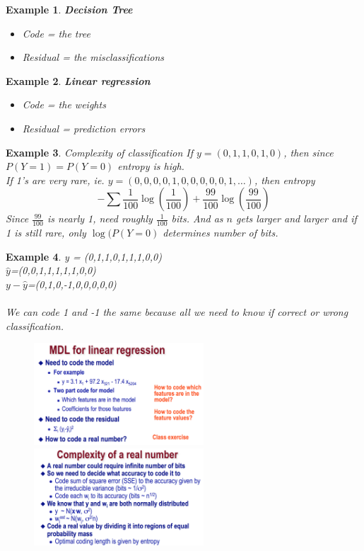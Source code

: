 \documentclass[a4paper]{article}\usepackage[]{graphicx}\usepackage[]{color}
\newtheorem{ex}{Example}[section]
\begin{document}
\begin{ex} \textbf{Decision Tree}
\begin{itemize}
\item Code = the tree
\item Residual = the misclassifications
\end{itemize}
\end{ex}

\begin{ex} \textbf{Linear regression}
\begin{itemize}
\item Code = the weights
\item Residual = prediction errors
\end{itemize}
\end{ex}

\begin{ex} \emph{Complexity of classification}
If $y = (0,1,1,0,1,0)$, then since $P(Y=1)=P(Y=0)$ entropy is high. \\
If 1's are very rare, ie. $y = (0,0,0,0,1,0,0,0,0,0,1,\ldots)$, then entropy
\begin{equation*}
-\sum \frac{1}{100}\log\left(\frac{1}{100}\right) + \frac{99}{100}\log\left(\frac{99}{100}\right)
\end{equation*}
Since $\frac{99}{100}$ is nearly 1, need roughly $\frac{1}{100}$ bits. And as $n$ gets larger and larger and if 1 is still rare, only $\log(P(Y=0)$ determines number of bits. 
\end{ex}

\begin{ex} 
y = (0,1,1,0,1,1,1,0,0) \\
$\hat{y}$=(0,0,1,1,1,1,1,0,0) \\
$y-\hat{y}$=(0,1,0,-1,0,0,0,0,0)\\
\\
We can code 1 and -1 the same because all we need to know if correct or wrong classification. 
\end{ex}

\begin{figure}[H]
\centering
\includegraphics[width=2.5in]{mdl_1.png}
\includegraphics[width=2.5in]{mdl_2.png}
\end{figure}
\end{document}
